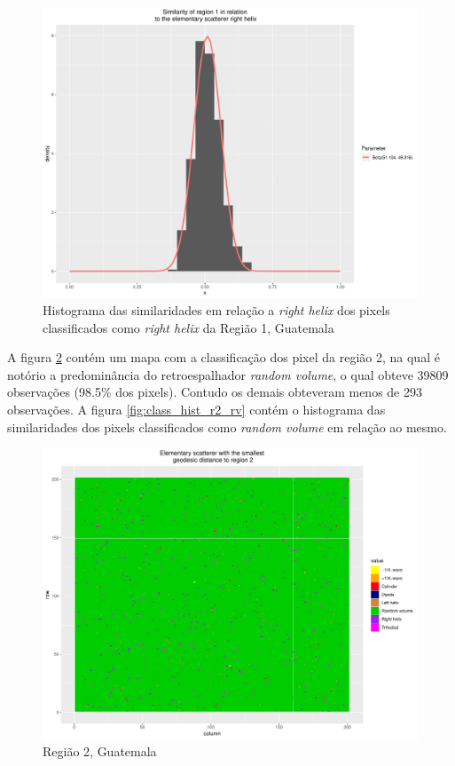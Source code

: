 \documentclass[12pt]{article}
\begin{document}
\begin{figure}[!h]
    \centering    
    \includegraphics[width = 0.85\linewidth]{../../Images/Report_18_12_20/Classifier_Geo_Dist/Histograms/Guate/region1_rh_sm_filter.pdf}
    \caption{Histograma das similaridades em relação a \textit{right helix} dos pixels classificados como \textit{right helix} da Região 1, Guatemala}
    \label{fig:class_hist_r1_rh}
\end{figure}

\newpage

A figura \ref{fig:class_map_r2} contém um mapa com a classificação dos pixel da região 2, na qual é notório a predominância do retroespalhador \textit{random volume}, o qual obteve 39809 observações (98.5\% dos pixels). Contudo os demais obteveram menos de 293 observações. A figura \ref{fig:class_hist_r2_rv} contém o histograma das similaridades dos pixels classificados como \textit{random volume} em relação ao mesmo.

\begin{figure}[!h]
    \centering    
    \includegraphics[width = 0.85\linewidth]{../../Images/Report_18_12_20/Classifier_Geo_Dist/Class_Map/Guate/region2_predomain.pdf}
    \caption{Região 2, Guatemala}
    \label{fig:class_map_r2}
\end{figure}
\end{document}
